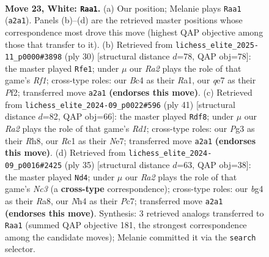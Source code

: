 \documentclass[11pt]{article}
\begin{document}
\clearpage

\begin{figure}[p]\centering
\begin{subfigure}{0.46\textwidth}\centering
\resizebox{\linewidth}{!}{%
\newchessgame
\chessboard[
  setfen={1n2r1k1/r3qpp1/1p1p1n2/4p2p/P1B1P1bN/2N3P1/R1PQ1P1P/2R3K1 w - - 7 23},
  showmover=false,
  pgfstyle=straightmove, color=movearrow, markmove={a2-a1}
]}
\caption{}
\end{subfigure}\hfill
\begin{subfigure}{0.46\textwidth}\centering
\resizebox{\linewidth}{!}{%
\newchessgame
\chessboard[
  setfen={r2qr1k1/1p3pbp/p2p1np1/7b/3N4/1PN1B1QP/1PP2PP1/R4RK1 w - - 0 16},
  showmover=false,
  pgfstyle=straightmove, color=movearrow, markmove={f1-e1}
]}
\caption{}
\end{subfigure}
\\[4pt]
\begin{subfigure}{0.46\textwidth}\centering
\resizebox{\linewidth}{!}{%
\newchessgame
\chessboard[
  setfen={2kr3r/1pp1n3/p2pq2p/4p2n/4P2P/2NRBP2/PPPQ4/1K5R b - - 2 21},
  showmover=false,
  pgfstyle=straightmove, color=movearrow, markmove={d8-f8}
]}
\caption{}
\end{subfigure}\hfill
\begin{subfigure}{0.46\textwidth}\centering
\resizebox{\linewidth}{!}{%
\newchessgame
\chessboard[
  setfen={r5k1/1ppq1pb1/1nn1r1pp/1P2p3/8/3P1NN1/2PB1PPP/1R1QR1K1 b - - 0 18},
  showmover=false,
  pgfstyle=straightmove, color=movearrow, markmove={c6-d4}
]}
\caption{}
\end{subfigure}
\caption{\textbf{Move 23, White: \texttt{Raa1}.} (a) Our position; Melanie plays \texttt{Raa1} (\texttt{a2a1}). Panels (b)--(d) are the retrieved master positions whose correspondence most drove this move (highest QAP objective among those that transfer to it). (b) Retrieved from \texttt{lichess\_elite\_2025-11\_p0000\#3898} (ply 30) [structural distance $d$=78, QAP obj=78]: the master played \texttt{Rfe1}; under $\mu$ our \emph{Ra2} plays the role of that game's \emph{Rf1}; cross-type roles: our \emph{B}c4 as their \emph{R}a1, our \emph{q}e7 as their \emph{P}f2; transferred move \texttt{a2a1} \textbf{(endorses this move)}. (c) Retrieved from \texttt{lichess\_elite\_2024-09\_p0022\#596} (ply 41) [structural distance $d$=82, QAP obj=66]: the master played \texttt{Rdf8}; under $\mu$ our \emph{Ra2} plays the role of that game's \emph{Rd1}; cross-type roles: our \emph{P}g3 as their \emph{R}h8, our \emph{R}c1 as their \emph{N}e7; transferred move \texttt{a2a1} \textbf{(endorses this move)}. (d) Retrieved from \texttt{lichess\_elite\_2024-09\_p0016\#2425} (ply 35) [structural distance $d$=63, QAP obj=38]: the master played \texttt{Nd4}; under $\mu$ our \emph{Ra2} plays the role of that game's \emph{Nc3} (a \textbf{cross-type} correspondence); cross-type roles: our \emph{b}g4 as their \emph{R}a8, our \emph{N}h4 as their \emph{P}c7; transferred move \texttt{a2a1} \textbf{(endorses this move)}. Synthesis: 3 retrieved analogs transferred to \texttt{Raa1} (summed QAP objective 181, the strongest correspondence among the candidate moves); Melanie committed it via the \texttt{search} selector.}
\label{fig:thought-m44}
\end{figure}
\end{document}
